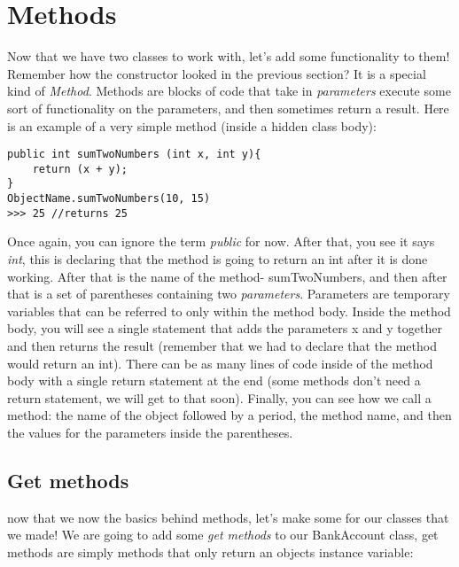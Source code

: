 \documentclass[14pt]{extreport}%
\begin{document}
\section*{Methods}

Now that we have two classes to work with, let's add some functionality to them! Remember how the constructor looked in the previous section? It is a special kind of \textit{Method}. Methods are blocks of code that take in \textit{parameters} execute some sort of functionality on the parameters, and then sometimes return a result. Here is an example of a very simple method (inside a hidden class body):

\begin{lstlisting}
public int sumTwoNumbers (int x, int y){
    return (x + y);
}
ObjectName.sumTwoNumbers(10, 15)
>>> 25 //returns 25
\end{lstlisting}{}
Once again, you can ignore the term \textit{public} for now. After that, you see it says \textit{int}, this is declaring that the method is going to return an int after it is done working. After that is the name of the method- sumTwoNumbers, and then after that is a set of parentheses containing two \textit{parameters}. Parameters are temporary variables that can be referred to only within the method body. Inside the method body, you will see a single statement that adds the parameters x and y together and then returns the result (remember that we had to declare that the method would return an int). There can be as many lines of code inside of the method body with a single return statement at the end (some methods don't need a return statement, we will get to that soon). Finally, you can see how we call a method: the name of the object followed by a period, the method name, and then the values for the parameters inside the parentheses.

\subsection*{Get methods}
now that we now the basics behind methods, let's make some for our classes that we made! We are going to add some \textit{get methods} to our BankAccount class, get methods are simply methods that only return an objects instance variable:
\end{document}
